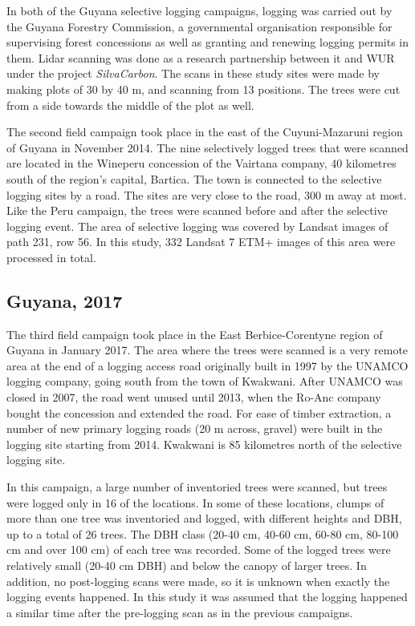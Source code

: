 \documentclass[a4paper,12pt]{scrbook}
\begin{document}
In both of the Guyana selective logging campaigns, logging was carried out by the Guyana Forestry Commission, a governmental organisation responsible for supervising forest concessions as well as granting and renewing logging permits in them. Lidar scanning was done as a research partnership between it and \ac{WUR} under the project \textit{SilvaCarbon}. The scans in these study sites were made by making plots of 30 by 40 m, and scanning from 13 positions. The trees were cut from a side towards the middle of the plot as well.%

The second field campaign took place in the east of the Cuyuni-Mazaruni region of Guyana in November 2014. The nine selectively logged trees that were scanned are located in the Wineperu concession of the Vairtana company, 40 kilometres south of the region's capital, Bartica. The town is connected to the selective logging sites by a road. The sites are very close to the road, 300 m away at most. Like the Peru campaign, the trees were scanned before and after the selective logging event. The area of selective logging was covered by Landsat images of path 231, row 56. In this study, 332 Landsat 7 \ac{ETM+} images of this area were processed in total.

\subsection{Guyana, 2017}

The third field campaign took place in the East Berbice-Corentyne region of Guyana in January 2017. The area where the trees were scanned is a very remote area at the end of a logging access road originally built in 1997 by the UNAMCO logging company, going south from the town of Kwakwani. After UNAMCO was closed in 2007, the road went unused until 2013, when the Ro-Anc company bought the concession and extended the road. For ease of timber extraction, a number of new primary logging roads (20 m across, gravel) were built in the logging site starting from 2014. Kwakwani is 85 kilometres north of the selective logging site.

In this campaign, a large number of inventoried trees were scanned, but trees were logged only in 16 of the locations. In some of these locations, clumps of more than one tree was inventoried and logged, with different heights and \ac{DBH}, up to a total of 26 trees. The \ac{DBH} class (20-40 cm, 40-60 cm, 60-80 cm, 80-100 cm and over 100 cm) of each tree was recorded. Some of the logged trees were relatively small (20-40 cm \ac{DBH}) and below the canopy of larger trees. In addition, no post-logging scans were made, so it is unknown when exactly the logging events happened. In this study it was assumed that the logging happened a similar time after the pre-logging scan as in the previous campaigns.
\end{document}
